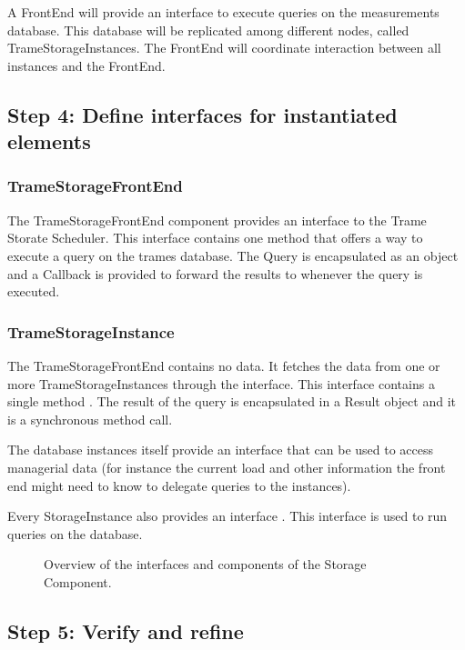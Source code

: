 \npar A FrontEnd will provide an interface to execute queries on the
measurements database. This database will be replicated among different nodes,
called TrameStorageInstances. The FrontEnd will coordinate interaction between
all instances and the FrontEnd.


\subsection{Step 4: Define interfaces for instantiated elements}
\label{add:it4/interfaces}

\subsubsection{TrameStorageFrontEnd}

\npar The TrameStorageFrontEnd component provides an interface
 to the Trame Storate Scheduler. This interface
contains one method  that offers a way
to execute a query on the trames database. The Query is encapsulated as an
object and a Callback is provided to forward the results to whenever the query
is executed.

\subsubsection{TrameStorageInstance}

\npar The TrameStorageFrontEnd contains no data. It fetches the data from one
or more TrameStorageInstances through the 
interface. This interface contains a single method . The result of the query is encapsulated in a Result object and it is
a synchronous method call.

\npar The database instances itself provide an interface
 that can be used to access managerial data (for
instance the current load and other information the front end might need to
know to delegate queries to the instances).

\npar Every StorageInstance also provides an interface .
This interface is used to run queries on the database. 


\begin{figure}[H]
	\begin{centering}
		\caption{Overview of the interfaces and components of the Storage Component.}
		\label{fig:it4/interfaces}
	\end{centering}
\end{figure}

\subsection{Step 5: Verify and refine}
\label{add:it4/verification}

